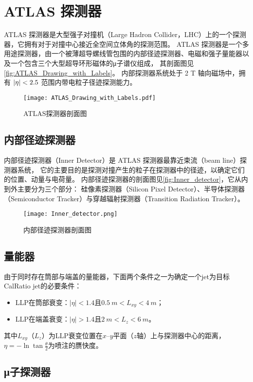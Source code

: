 
\chapter{ATLAS 探测器}
ATLAS 探测器是大型强子对撞机（Large Hadron Collider，LHC）上的一个探测器，它拥有对于对撞中心接近全空间立体角的探测范围。
ATLAS 探测器是一个多用途探测器，由一个被薄超导螺线管包围的内部径迹探测器、电磁和强子量能器以及一个包含三个大型超导环形磁体的μ子谱仪组成，
其剖面图见\autoref{fig:ATLAS_Drawing_with_Labels}。
内部探测器系统处于 2 T 轴向磁场中，拥有 $\abs{\eta} < 2.5$ 范围内带电粒子径迹探测能力。
\cite{ATLAS_detector}

\begin{figure}[ht]
    \centering
    \texttt{[image: ATLAS\_Drawing\_with\_Labels.pdf]}
    \caption{ATLAS探测器剖面图}
    \label{fig:ATLAS_Drawing_with_Labels}
\end{figure}


\section{内部径迹探测器}
内部径迹探测器（Inner Detector）是 ATLAS 探测器最靠近束流（beam line）探测器系统，
它的主要目的是探测对撞产生的粒子在探测器中的径迹，以确定它们的位置、动量与电荷量。
内部径迹探测器的剖面图见\autoref{fig:Inner_detector}，它从内到外主要分为三个部分：
硅像素探测器（Silicon Pixel Detector）、半导体探测器（Semiconductor Tracker）与穿越辐射探测器（Transition Radiation Tracker）。

\begin{figure}[ht]
    \centering
    \texttt{[image: Inner\_detector.png]}
    \caption{内部径迹探测器剖面图}
    \label{fig:Inner_detector}
\end{figure}



\section{量能器}
由于同时存在筒部与端盖的量能器，下面两个条件之一为确定一个jet为目标CalRatio jet的必要条件：
\begin{itemize}
    \item LLP在筒部衰变：$|\eta|<1.4$且$\SI{0.5}{m}<L_{xy}<\SI{4}{m}$；
    \item LLP在端盖衰变：$|\eta|>1.4$且$\SI{2}{m}<L_{z}<\SI{6}{m}$。
\end{itemize}
其中$L_{xy}$（$L_{z}$）为LLP衰变位置在$x$--$y$平面（$z$轴）上与探测器中心的距离，
$\eta=-\ln \tan \frac{\theta}{2}$为喷注的赝快度。

\section{μ子探测器}
